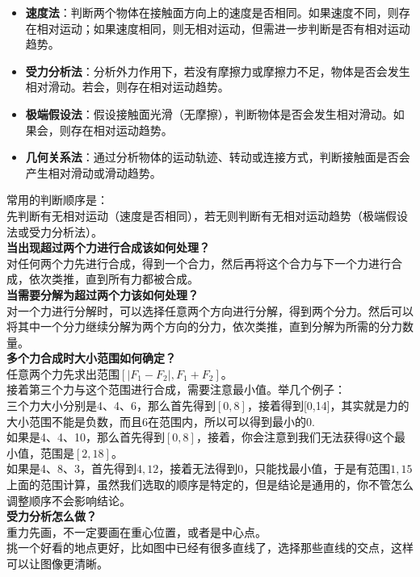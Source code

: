 \documentclass[a4paper, landscape, 10pt, twocolumn]{article}
\begin{document}
\begin{itemize}
  \item
    \textbf{速度法}：判断两个物体在接触面方向上的速度是否相同。如果速度不同，则存在相对运动；如果速度相同，则无相对运动，但需进一步判断是否有相对运动趋势。
  \item \textbf{受力分析法}：分析外力作用下，若没有摩擦力或摩擦力不足，物体是否会发生相对滑动。若会，则存在相对运动趋势。
  \item \textbf{极端假设法}：假设接触面光滑（无摩擦），判断物体是否会发生相对滑动。如果会，则存在相对运动趋势。
  \item \textbf{几何关系法}：通过分析物体的运动轨迹、转动或连接方式，判断接触面是否会产生相对滑动或滑动趋势。
\end{itemize}

\noindent 常用的判断顺序是：\\
先判断有无相对运动（速度是否相同），若无则判断有无相对运动趋势（极端假设法或受力分析法）。\\
\textbf{当出现超过两个力进行合成该如何处理？}\\
对任何两个力先进行合成，得到一个合力，然后再将这个合力与下一个力进行合成，依次类推，直到所有力都被合成。\\
\textbf{当需要分解为超过两个力该如何处理？}\\
对一个力进行分解时，可以选择任意两个方向进行分解，得到两个分力。然后可以将其中一个分力继续分解为两个方向的分力，依次类推，直到分解为所需的分力数量。\\
\textbf{多个力合成时大小范围如何确定？}\\
任意两个力先求出范围$[|F_1 - F_2|, F_1 + F_2]$。\\
接着第三个力与这个范围进行合成，需要注意最小值。举几个例子：\\
三个力大小分别是4、4、6，那么首先得到$[0,8]$，接着得到[0,14]，其实就是力的大小范围不能是负数，而且6在范围内，所以可以得到最小的0.\\
如果是4、4、10，那么首先得到$[0,8]$，接着，你会注意到我们无法获得0这个最小值，范围是$[2,18]$。\\
如果是4、8、3，首先得到$4,12$，接着无法得到0，只能找最小值，于是有范围$1,15$\\
上面的范围计算，虽然我们选取的顺序是特定的，但是结论是通用的，你不管怎么调整顺序不会影响结论。\\
\textbf{受力分析怎么做？}\\
重力先画，不一定要画在重心位置，或者是中心点。\\
挑一个好看的地点更好，比如图中已经有很多直线了，选择那些直线的交点，这样可以让图像更清晰。\\
\end{document}
